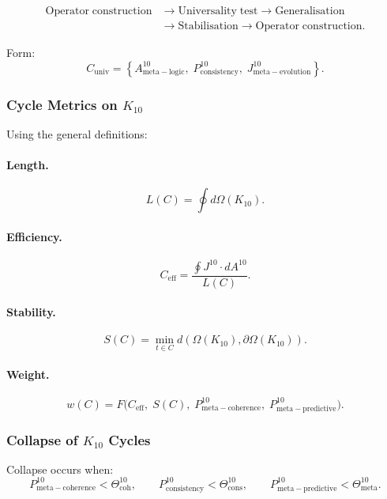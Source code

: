 \[
  \begin{aligned}
  \mathrm{Operator\;construction}
  &\to \mathrm{Universality\;test}
  \to \mathrm{Generalisation}\\
  &\to \mathrm{Stabilisation}
  \to \mathrm{Operator\;construction}.
  \end{aligned}
\]

Form:
\[
  C_{\mathrm{univ}}
  =
  \left\{
    A^{10}_{\mathrm{meta\!-\!logic}},\;
    P^{10}_{\mathrm{consistency}},\;
    J^{10}_{\mathrm{meta\!-\!evolution}}
  \right\}.
\]


\subsubsection{Cycle Metrics on $K_{10}$}

Using the general definitions:

\paragraph{Length.}
\[
  L(C) = \oint d\Omega(K_{10}).
\]

\paragraph{Efficiency.}
\[
  C_{\mathrm{eff}} =
  \frac{\oint J^{10}\cdot dA^{10}}{L(C)}.
\]

\paragraph{Stability.}
\[
  S(C) 
   = \min_{t\in C}
     d(\Omega(K_{10}), \partial\Omega(K_{10})).
\]

\paragraph{Weight.}
\[
  w(C)
    = F\big(
        C_{\mathrm{eff}},\;
        S(C),\;
        P^{10}_{\mathrm{meta\!-\!coherence}},\;
        P^{10}_{\mathrm{meta\!-\!predictive}}
      \big).
\]


\subsubsection{Collapse of $K_{10}$ Cycles}

Collapse occurs when:
\[
  P^{10}_{\mathrm{meta\!-\!coherence}} < \Theta^{10}_{\mathrm{coh}},\qquad
  P^{10}_{\mathrm{consistency}} < \Theta^{10}_{\mathrm{cons}},\qquad
  P^{10}_{\mathrm{meta\!-\!predictive}} < \Theta^{10}_{\mathrm{meta}}.
\]

